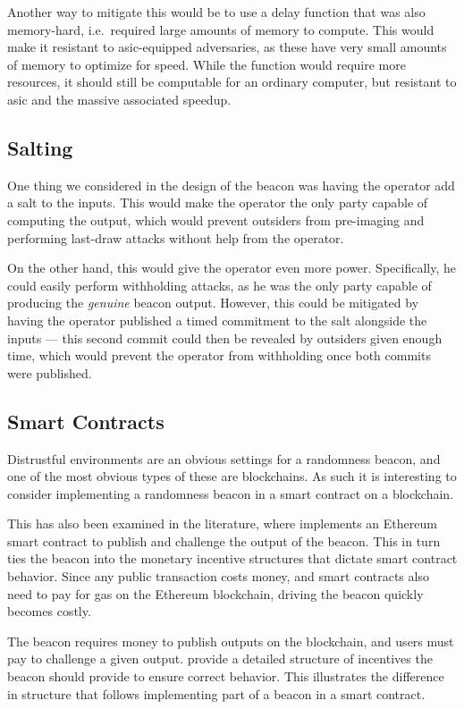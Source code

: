 Another way to mitigate this would be to use a delay function that was also memory-hard, i.e.\ required large amounts of memory to compute. This would make it resistant to \gls{asic}-equipped adversaries, as these have very small amounts of memory to optimize for speed. While the function would require more resources, it should still be computable for an ordinary computer, but resistant to \gls{asic} and the massive associated speedup.

\subsection{Salting}

One thing we considered in the design of the beacon was having the operator add a salt to the inputs.
This would make the operator the only party capable of computing the output, which would prevent outsiders from pre-imaging and performing last-draw attacks without help from the operator.

On the other hand, this would give the operator even more power. Specifically, he could easily perform withholding attacks, as he was the only party capable of producing the \textit{genuine} beacon output. However, this could be mitigated by having the operator published a timed commitment to the salt alongside the inputs --- this second commit could then be revealed by outsiders given enough time, which would prevent the operator from withholding once both commits were published.

\subsection{Smart Contracts}
Distrustful environments are an obvious settings for a randomness beacon, and one of the most obvious types of these are blockchains. As such it is interesting to consider implementing a randomness beacon in a smart contract on a blockchain.

This has also been examined in the literature, where \citet{bunz2017proofsof} implements an Ethereum smart contract to publish and challenge the output of the beacon. This in turn ties the beacon into the monetary incentive structures that dictate smart contract behavior. Since any public transaction costs money, and smart contracts also need to pay for gas on the Ethereum blockchain, driving the beacon quickly becomes costly.

The beacon requires money to publish outputs on the blockchain, and users must pay to challenge a given output. \citet{bunz2017proofsof} provide a detailed structure of incentives the beacon should provide to ensure correct behavior. This illustrates the difference in structure that follows implementing part of a beacon in a smart contract.

